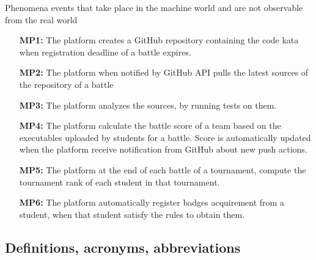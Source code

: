 \documentclass{article}
\newcounter{subsubsubsection}[subsubsection]
\begin{document}
        Phenomena events that take place in the machine world and are not observable from the real world
        \begin{enumerate}
            \item[\textbf{MP1:}] The platform creates a GitHub repository containing the code kata when registration deadline of a battle expires.
            \item[\textbf{MP2:}] The platform when notified by GitHub API pulls the latest sources of the repository of a battle
            \item[\textbf{MP3:}] The platform analyzes the sources, by running tests on them.
            \item[\textbf{MP4:}] The platform calculate the battle score of a team based on the executables uploaded by students for a battle. Score is automatically updated when the platform receive notification from GitHub about new push actions.
            \item[\textbf{MP5:}] The platform at the end of each battle of a tournament, compute the tournament rank of each student in that tournament.
            \item[\textbf{MP6:}] The platform automatically register badges acquirement from a student, when that student satisfy the rules to obtain them.
        \end{enumerate}

    
\subsection{Definitions, acronyms, abbreviations}
\end{document}
